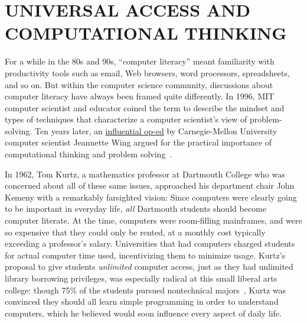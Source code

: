 
\section{UNIVERSAL ACCESS AND COMPUTATIONAL THINKING}




For a while in the 80s and 90s, ``computer literacy'' meant familiarity
with productivity tools such as email, Web browsers, word processors,
spreadsheets, and so on.
But within the computer science community, discussions about computer
literacy have always been framed quite differently.
In 1996, MIT computer scientist and educator  coined
the term  to describe the mindset and types of
techniques that characterize a computer scientist's view of
problem-solving.
Ten years later, an
\href{http://www.cs.cmu.edu/afs/cs/usr/wing/www/publications/Wing06.pdf}{influential
op-ed} by Carnegie-Mellon University computer scientist Jeannette Wing
argued for the practical importance of computational thinking and
problem solving~\cite{wing_computational_thinking}.

In 1962, Tom Kurtz, a mathematics professor at Dartmouth College who was
concerned about
all of these same issues, approached his department chair John Kemeny
with a remarkably farsighted vision: Since computers were clearly going
to be important in everyday life, \emph{all} Dartmouth students should
become computer literate.
At the time,
computers were room-filling mainframes, and were so expensive
that they could only be rented, at a monthly cost typically exceeding a
professor's salary.
Universities that had computers charged students for actual
computer time used, incentivizing them to minimize usage.
Kurtz's proposal to give students
\emph{unlimited} computer access, just as they had unlimited library borrowing privileges,
was especially radical at this small liberal arts 
college: though 75\% of the students pursued nontechnical majors~\cite{goto},
Kurtz was convinced they should all learn simple programming in order to understand
computers, which he believed would soon influence every aspect
of daily life.

